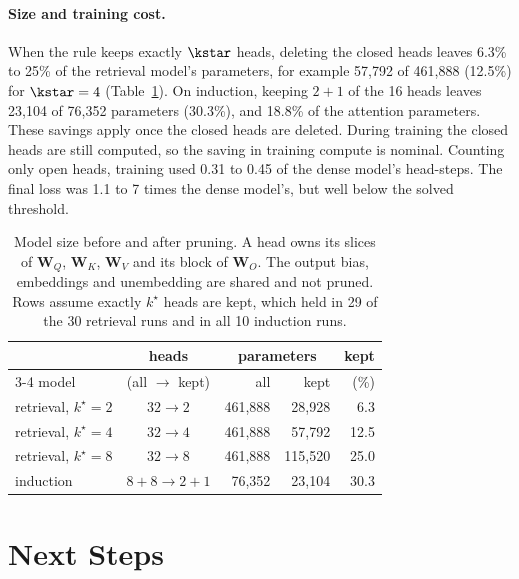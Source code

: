 \paragraph{Size and training cost.}
When the rule keeps exactly $\kstar$ heads, deleting the closed heads leaves 6.3\% to 25\% of the retrieval model's parameters, for example 57{,}792 of 461{,}888 (12.5\%) for $\kstar = 4$ (Table~\ref{tab:params}). On induction, keeping $2 + 1$ of the 16 heads leaves 23{,}104 of 76{,}352 parameters (30.3\%), and 18.8\% of the attention parameters. These savings apply once the closed heads are deleted. During training the closed heads are still computed, so the saving in training compute is nominal. Counting only open heads, training used 0.31 to 0.45 of the dense model's head-steps. The final loss was 1.1 to 7 times the dense model's, but well below the solved threshold.

\begin{table}[h]
\centering
\small
\setlength{\tabcolsep}{5pt}
\begin{tabular}{lcrrr}
\toprule
 & heads & \multicolumn{2}{c}{parameters} & kept \\
\cmidrule(lr){3-4}
model & (all $\to$ kept) & all & kept & (\%) \\
\midrule
retrieval, $k^\star = 2$ & $32 \to 2$         & 461{,}888 & 28{,}928  & 6.3  \\
retrieval, $k^\star = 4$ & $32 \to 4$         & 461{,}888 & 57{,}792  & 12.5 \\
retrieval, $k^\star = 8$ & $32 \to 8$         & 461{,}888 & 115{,}520 & 25.0 \\
induction                & $8{+}8 \to 2{+}1$  & 76{,}352  & 23{,}104  & 30.3 \\
\bottomrule
\end{tabular}
\caption{Model size before and after pruning. A head owns its slices of $\bm W_Q$, $\bm W_K$, $\bm W_V$ and its block of $\bm W_O$. The output bias, embeddings and unembedding are shared and not pruned. Rows assume exactly $k^\star$ heads are kept, which held in 29 of the 30 retrieval runs and in all 10 induction runs.}
\label{tab:params}
\end{table}

\section{Next Steps}
\label{sec:remaining}


